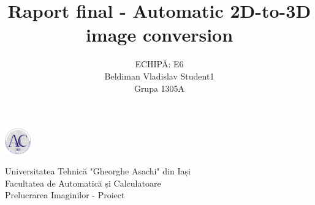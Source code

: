\documentclass[12pt]{article}
\title{\textbf{Raport final - Automatic 2D-to-3D image conversion}}
\author{
 	ECHIPĂ: E6
	\\
	 Beldiman Vladislav Student1
	\\
	Grupa 1305A
}
\begin{document}
\noindent\begin{minipage}{0.1\textwidth}
	\includegraphics[width=1.1cm]{logo_AC.png}
\end{minipage}
\hfill
\begin{minipage}{1\textwidth}\raggedright
	Universitatea Tehnică "Gheorghe Asachi" din Iași\\
	Facultatea de Automatică și Calculatoare\\
	Prelucrarea Imaginilor - Proiect
\end{minipage}

{\let\newpage\relax\maketitle}
\end{document}
